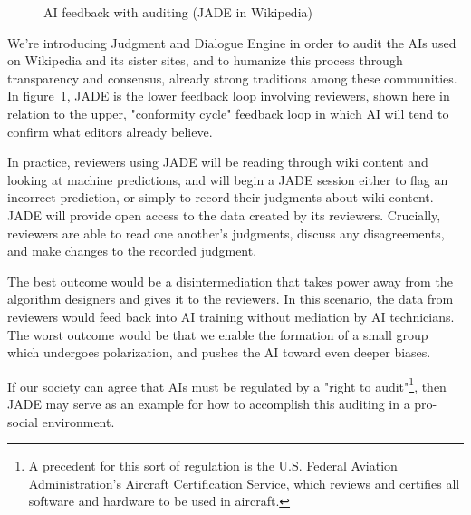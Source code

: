 \documentclass[format=sigconf]{acmart}
\begin{document}
\begin{figure}
\caption{AI feedback with auditing (JADE in Wikipedia)}\label{fig:audited}
\end{figure}

We're introducing Judgment and Dialogue Engine in order to audit the AIs used on Wikipedia and its sister sites, and to humanize this process through transparency and consensus, already strong traditions among these communities.  In figure~\ref{fig:audited}, JADE is the lower feedback loop involving reviewers, shown here in relation to the upper, "conformity cycle" feedback loop in which AI will tend to confirm what editors already believe.

In practice, reviewers using JADE will be reading through wiki content and looking at machine predictions, and will begin a JADE session either to flag an incorrect prediction, or simply to record their judgments about wiki content.  JADE will provide open access to the data created by its reviewers.  Crucially, reviewers are able to read one another's judgments, discuss any disagreements, and make changes to the recorded judgment.

The best outcome would be a disintermediation that takes power away from the algorithm designers and gives it to the reviewers.  In this scenario, the data from reviewers would feed back into AI training without mediation by AI technicians.  The worst outcome would be that we enable the formation of a small group which undergoes polarization, and pushes the AI toward even deeper biases.

If our society can agree that AIs must be regulated by a "right to audit"\footnote{A precedent for this sort of regulation is the U.S. Federal Aviation Administration's Aircraft Certification Service, which reviews and certifies all software and hardware to be used in aircraft.}, then JADE may serve as an example for how to accomplish this auditing in a pro-social environment.


\end{document}
